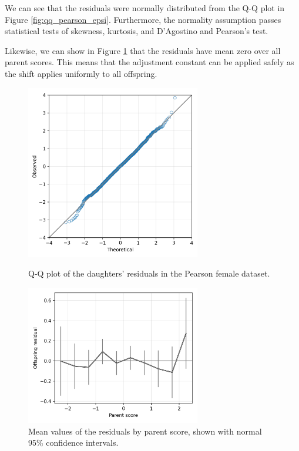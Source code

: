\documentclass[letterpaper,10pt]{article} %
\begin{document}
We can see that the residuals were normally distributed from the Q-Q plot in Figure \ref{fig:qq_pearson_epsi}. Furthermore, the normality assumption passes statistical tests of skewness, kurtosis, and D’Agostino and Pearson's test.

Likewise, we can show in Figure \ref{fig:pearson_residuals_by_score} that the residuals have mean zero over all parent scores. This means that the adjustment constant can be applied safely as the shift applies uniformly to all offspring. 


\begin{figure}[p]
\includegraphics[width=3in]{figures/qq_pearson_epsi.png}
\centering
\caption{Q-Q plot of the daughters' residuals in the Pearson female dataset.}
\label{fig:qq_pearson_epsi}

\vspace{2cm}

\includegraphics[width=3in]{figures/pearson_residuals_by_score.png}
\centering
\caption{Mean values of the residuals by parent score, shown with normal 95\% confidence intervals.}
\label{fig:pearson_residuals_by_score}
\end{figure}
\end{document}
